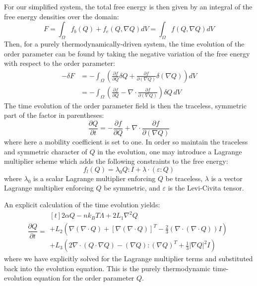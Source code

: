 \documentclass[reqno]{article}
\begin{document}
  For our simplified system, the total free energy is then given by an integral
  of the free energy densities over the domain:
  \begin{equation}
    F
    = \int_\Omega f_b(Q) + f_e(Q, \nabla Q) dV
    = \int_\Omega f(Q, \nabla Q) dV
  \end{equation}
  Then, for a purely thermodynamically-driven system, the time evolution
  of the order parameter can be found
  by taking the negative variation of the free energy with respect to the order
  parameter:
  \begin{equation}
    \begin{split}
    -\delta F
    &= -\int_\Omega \left( \frac{\partial f}{\partial Q} \delta Q
      + \frac{\partial f}{\partial (\nabla Q)} \delta (\nabla Q) \right) dV \\
    &= -\int_\Omega \left(
      \frac{\partial f}{\partial Q}
      - \nabla \cdot \frac{\partial f}{\partial (\nabla Q)}
    \right) \delta Q \, dV
    \end{split}
  \end{equation}
  The time evolution of the order parameter field is then the traceless,
  symmetric part of the factor in parentheses:
  \begin{equation}
    \frac{\partial Q}{\partial t}
    =
    -\frac{\partial f}{\partial Q}
    + \nabla \cdot \frac{\partial f}{\partial (\nabla Q)}
  \end{equation}
  where here a mobility coefficient is set to one.
  In order so maintain the traceless and symmetric character of $Q$ in the
  evolution, one may
  introduce a Lagrange multiplier scheme which adds the following constraints to
  the free energy:
  \begin{equation}
    f_l (Q) = \lambda_0 Q : I + \lambda \cdot \left( \varepsilon : Q \right)
  \end{equation}
  where $\lambda_0$ is a scalar Lagrange multiplier enforcing $Q$ be traceless,
  $\lambda$ is a vector Lagrange multiplier enforcing $Q$ be symmetric, and
  $\varepsilon$ is the Levi-Civita tensor.
  
  An explicit calculation of the time evolution yields:
  \begin{equation} \label{eq:Q-time-evolution}
    \frac{\partial Q}{\partial t}
    =
    \begin{multlined}[t]
      2 \alpha Q - n k_B T \Lambda + 2 L_1 \nabla^2 Q \\
      + L_2 \left(
        \nabla \left( \nabla \cdot Q \right)
        + \left[ \nabla \left( \nabla \cdot Q \right) \right]^T
        - \tfrac23 \left( \nabla \cdot \left( \nabla \cdot Q \right) \right) I
      \right) \\
      + L_3 \left(
        2 \nabla \cdot \left( Q \cdot \nabla Q \right)
        - \left( \nabla Q \right) : \left( \nabla Q \right)^T
        + \tfrac13 \left| \nabla Q \right|^2 I
      \right)
    \end{multlined}
  \end{equation}
  where we have explicitly solved for the Lagrange multiplier terms and
  substituted back into the evolution equation.
  This is the purely thermodynamic time-evolution equation for the order
  parameter $Q$.
  
\end{document}

